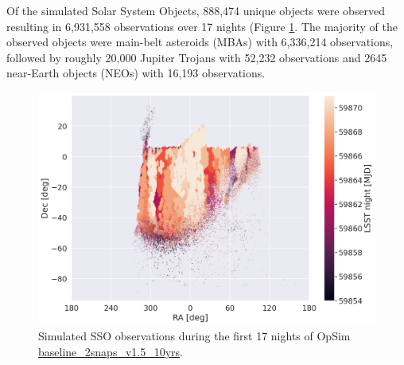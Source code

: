 Of the simulated Solar System Objects, 888,474 unique objects were observed resulting in 6,931,558 observations over 17 nights (Figure \ref{fig:observations}. The majority of the observed objects were main-belt asteroids (MBAs) with 6,336,214 observations, followed by roughly 20,000 Jupiter Trojans with 52,232 observations and 2645 near-Earth objects (NEOs) with 16,193 observations.
\\



\begin{figure}
	\centering
	\includegraphics[width=0.9\columnwidth]{observations_n1-17.png}
	\caption{Simulated SSO observations during the first 17 nights of OpSim \href{http://astro-lsst-01.astro.washington.edu:8081/allMetricResults?runId=13}{baseline\_2snaps\_v1.5\_10yrs}.}
	\label{fig:observations}
\end{figure}

